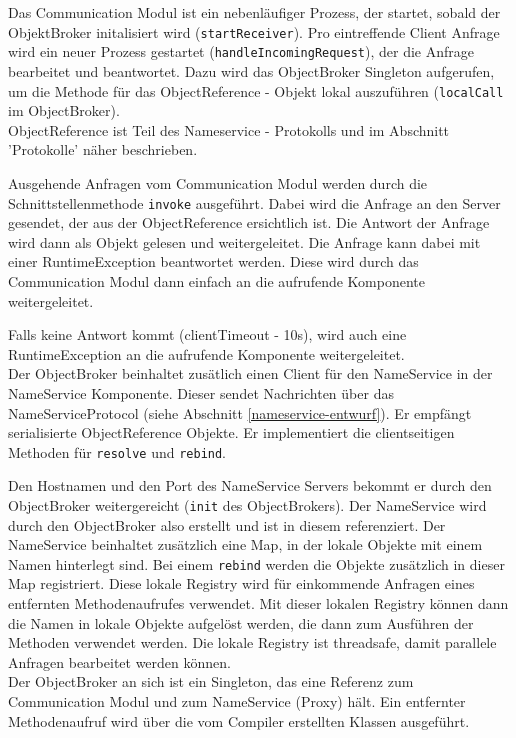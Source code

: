 \documentclass{article}
\begin{document}
Das Communication Modul ist ein nebenläufiger Prozess, der startet, sobald der ObjektBroker initalisiert wird
(\texttt{startReceiver}). Pro eintreffende Client Anfrage wird ein neuer Prozess gestartet
(\texttt{handleIncomingRequest}), der die Anfrage bearbeitet und beantwortet. Dazu wird das ObjectBroker Singleton
aufgerufen, um die Methode für das ObjectReference - Objekt lokal auszuführen (\texttt{localCall} im ObjectBroker).\\
ObjectReference ist Teil des Nameservice - Protokolls und im Abschnitt 'Protokolle' näher beschrieben.

Ausgehende Anfragen vom Communication Modul werden durch die Schnittstellenmethode \texttt{invoke} ausgeführt.
Dabei wird die Anfrage an den Server gesendet, der aus der ObjectReference ersichtlich ist. Die Antwort der Anfrage
wird dann als Objekt gelesen und weitergeleitet. Die Anfrage kann dabei mit einer RuntimeException beantwortet werden.
Diese wird durch das Communication Modul dann einfach an die aufrufende Komponente weitergeleitet.

Falls keine Antwort kommt (clientTimeout - 10s), wird auch eine RuntimeException an die aufrufende Komponente
weitergeleitet.\\

Der ObjectBroker beinhaltet zusätlich einen Client für den NameService in der NameService Komponente. Dieser sendet
Nachrichten über das NameServiceProtocol (siehe Abschnitt \ref{nameservice-entwurf}). Er empfängt serialisierte
ObjectReference Objekte. Er implementiert die clientseitigen Methoden für \texttt{resolve} und \texttt{rebind}.

Den Hostnamen und den Port des NameService Servers bekommt er durch den ObjectBroker weitergereicht
(\texttt{init} des ObjectBrokers). Der NameService wird durch den ObjectBroker also erstellt und ist in diesem
referenziert. Der NameService beinhaltet zusätzlich eine Map, in der lokale Objekte mit einem Namen hinterlegt sind.
Bei einem \texttt{rebind} werden die Objekte zusätzlich in dieser Map registriert.
Diese lokale Registry wird für einkommende Anfragen eines entfernten Methodenaufrufes verwendet. Mit dieser lokalen
Registry können dann die Namen in lokale Objekte aufgelöst werden, die dann zum Ausführen der Methoden verwendet werden.
Die lokale Registry ist threadsafe, damit parallele Anfragen bearbeitet werden können.\\

Der ObjectBroker an sich ist ein Singleton, das eine Referenz zum Communication Modul und zum NameService (Proxy) hält.
Ein entfernter Methodenaufruf wird über die vom Compiler erstellten Klassen ausgeführt.
\end{document}
